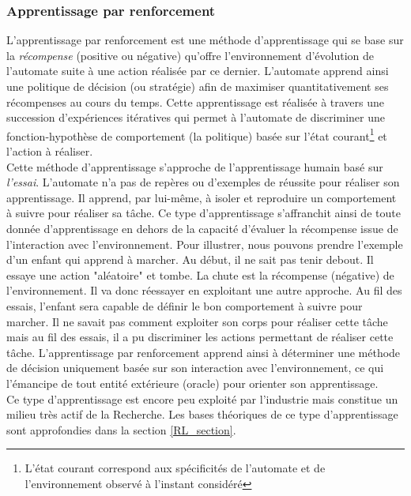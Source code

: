 \subsubsection{Apprentissage par renforcement}

\noindent L'apprentissage par renforcement est une méthode d'apprentissage qui se base sur la \textit{récompense} (positive ou négative) qu'offre l'environnement d'évolution de l'automate suite à une action réalisée par ce dernier. L'automate apprend ainsi une politique de décision (ou stratégie) afin de maximiser quantitativement ses récompenses au cours du temps. Cette apprentissage est réalisée à travers une succession d'expériences itératives qui permet à l'automate de discriminer une fonction-hypothèse de comportement (la politique) basée sur l'état courant\footnote{L'état courant correspond aux spécificités de l'automate et de l'environnement observé à l'instant considéré} et l'action à réaliser.\\

\noindent Cette méthode d'apprentissage s'approche de l'apprentissage humain basé sur \textit{l'essai}. L'automate n'a pas de repères ou d'exemples de réussite pour réaliser son apprentissage. Il apprend, par lui-même, à isoler et reproduire un comportement à suivre pour réaliser sa tâche. Ce type d'apprentissage s'affranchit ainsi de toute donnée d'apprentissage en dehors de la capacité d'évaluer la récompense issue de l'interaction avec l'environnement. Pour illustrer, nous pouvons prendre l'exemple d'un enfant qui apprend à marcher. Au début, il ne sait pas tenir debout. Il essaye une action "aléatoire" et tombe. La chute est la récompense (négative) de l'environnement. Il va donc réessayer en exploitant une autre approche. Au fil des essais, l'enfant sera capable de définir le bon comportement à suivre pour marcher. Il ne savait pas comment exploiter son corps pour réaliser cette tâche mais au fil des essais, il a pu discriminer les actions permettant de réaliser cette tâche. L'apprentissage par renforcement apprend ainsi à déterminer une méthode de décision uniquement basée sur son interaction avec l'environnement, ce qui l'émancipe de tout entité extérieure (oracle) pour orienter son apprentissage.\\

\noindent Ce type d'apprentissage est encore peu exploité par l'industrie mais constitue un milieu très actif de la Recherche. Les bases théoriques de ce type d'apprentissage sont approfondies dans la section \ref{RL_section}.

